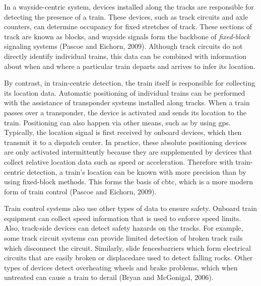 \documentclass[11pt, titlepage]{article}
\begin{document}
In a wayside-centric system, devices installed along the tracks are responsible
for detecting the presence of a train. These devices, such as track circuits and
axle counters, can determine occupancy for fixed stretches of track. These
sections of track are known as blocks, and wayside signals form the backbone of
\textit{fixed-block} signaling systems (Pascoe and Eichorn, 2009). Although track
circuits do not directly identify individual trains, this data can be combined
with information about when and where a particular train departs and arrives to
infer its location.

By contrast, in train-centric detection, the train itself is responsible for
collecting its location data. Automatic positioning of individual trains can be
performed with the assistance of transponder systems installed along tracks. When
a train passes over a transponder, the device is activated and sends its location
to the train. Positioning can also happen via other means, such as by using
\gls{gps}. Typically, the location signal is first received by onboard devices,
which then transmit it to a dispatch center. In practice, these absolute
positioning devices are only activated intermittently because they are
supplemented by devices that collect relative location data such as speed or
acceleration. Therefore with train-centric detection, a train’s location can be
known with more precision than by using fixed-block methods. This forms the basis
of \gls{cbtc}, which is a more modern form of train control (Pascoe and Eichorn,
2009).

Train control systems also use other types of data to ensure safety. Onboard train
equipment can collect speed information that is used to enforce speed limits.
Also, track-side devices can detect safety hazards on the tracks. For example,
some track circuit systems can provide limited detection of broken track rails
which disconnect the circuit. Similarly, slide fences\textemdash barriers which
form electrical circuits that are easily broken or displaced\textemdash are used
to detect falling rocks. Other types of devices detect overheating wheels and
brake problems, which when untreated can cause a train to derail (Bryan and
McGonigal, 2006).
\end{document}

